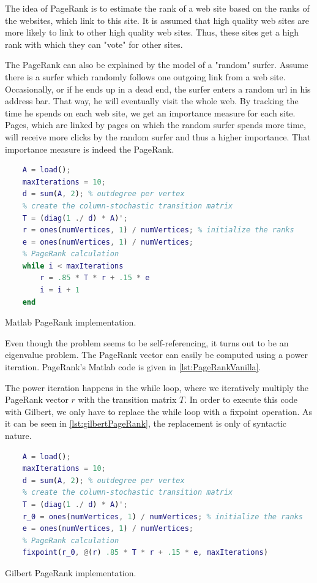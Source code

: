 The idea of PageRank is to estimate the rank of a web site based on the ranks of the websites, which link to this site.
It is assumed that high quality web sites are more likely to link to other high quality web sites.
Thus, these sites get a high rank with which they can "vote" for other sites.

The PageRank can also be explained by the model of a "random" surfer.
Assume there is a surfer which randomly follows one outgoing link from a web site.
Occasionally, or if he ends up in a dead end, the surfer enters a random url in his address bar.
That way, he will eventually visit the whole web.
By tracking the time he spends on each web site, we get an importance measure for each site.
Pages, which are linked by pages on which the random surfer spends more time, will receive more clicks by the random surfer and thus a higher importance.
That importance measure is indeed the PageRank.

\begin{listing}[!h]
	\begin{CenteredBox}
		\begin{lstlisting}[language=Matlab]
	% load adjacency matrix
	A = load(); 
	maxIterations = 10;
	d = sum(A, 2); % outdegree per vertex
	% create the column-stochastic transition matrix
	T = (diag(1 ./ d) * A)'; 
	r = ones(numVertices, 1) / numVertices; % initialize the ranks
	e = ones(numVertices, 1) / numVertices;
	% PageRank calculation
	while i < maxIterations
		r = .85 * T * r + .15 * e
		i = i + 1
	end
		\end{lstlisting}
	\end{CenteredBox}
	\caption{Matlab PageRank implementation.}
	\label{lst:PageRankVanilla}
\end{listing}

Even though the problem seems to be self-referencing, it turns out to be an eigenvalue problem.
The PageRank vector can easily be computed using a power iteration.
PageRank's Matlab code is given in \cref{lst:PageRankVanilla}.

The power iteration happens in the while loop, where we iteratively multiply the PageRank vector $r$ with the transition matrix $T$.
In order to execute this code with Gilbert, we only have to replace the while loop with a fixpoint operation.
As it can be seen in \cref{lst:gilbertPageRank}, the replacement is only of syntactic nature.

\begin{listing}[!h]
	\begin{CenteredBox}
		\begin{lstlisting}[language=Matlab]
	% load adjacency matrix
	A = load();
	maxIterations = 10;
	d = sum(A, 2); % outdegree per vertex
	% create the column-stochastic transition matrix
	T = (diag(1 ./ d) * A)'; 
	r_0 = ones(numVertices, 1) / numVertices; % initialize the ranks
	e = ones(numVertices, 1) / numVertices;
	% PageRank calculation
	fixpoint(r_0, @(r) .85 * T * r + .15 * e, maxIterations)
		\end{lstlisting}
	\end{CenteredBox}
	\caption{Gilbert PageRank implementation.}
	\label{lst:gilbertPageRank}
\end{listing}

